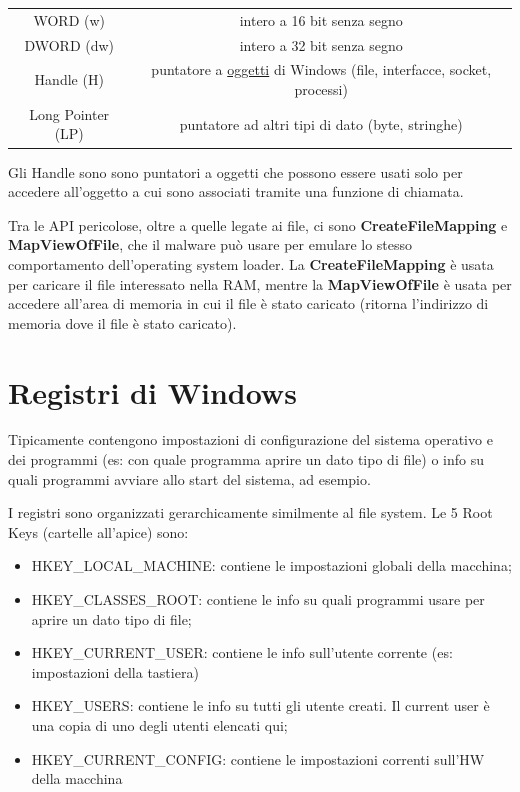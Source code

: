 \documentclass[a4paper]{book}
\begin{document}
\begin{table}[h]
    \centering
    \begin{tabular}{c|c}
        WORD (w)     &  intero a 16 bit senza segno\\
        DWORD  (dw)   & intero a 32 bit senza segno\\
        Handle  (H) & puntatore a \underline{oggetti} di Windows (file, interfacce, socket, processi)\\
        Long Pointer (LP) & puntatore ad altri tipi di dato (byte, stringhe)
    \end{tabular}
\end{table}

Gli Handle sono sono puntatori a oggetti che possono essere usati solo per accedere all'oggetto a cui sono associati tramite una funzione di chiamata.

Tra le API pericolose, oltre a quelle legate ai file, ci sono \textbf{CreateFileMapping} e \textbf{MapViewOfFile}, che il malware può usare per emulare lo stesso comportamento dell'operating system loader. La \textbf{CreateFileMapping} è usata per caricare il file interessato nella RAM, mentre la \textbf{MapViewOfFile} è usata per accedere all'area di memoria in cui il file è stato caricato (ritorna l'indirizzo di memoria dove il file è stato caricato). 

\section{Registri di Windows}
Tipicamente contengono impostazioni di configurazione del sistema operativo e dei programmi (es: con quale programma aprire un dato tipo di file) o info su quali programmi avviare allo start del sistema, ad esempio.

I registri sono organizzati gerarchicamente similmente al file system. Le 5 Root Keys (cartelle all'apice) sono:
\begin{itemize}
    \item HKEY\_LOCAL\_MACHINE: contiene le impostazioni globali della macchina; 
    \item HKEY\_CLASSES\_ROOT: contiene le info su quali programmi usare per aprire un dato tipo di file;
    \item HKEY\_CURRENT\_USER: contiene le info sull'utente corrente (es: impostazioni della tastiera)
    \item HKEY\_USERS: contiene le info su tutti gli utente creati. Il current user è una copia di uno degli utenti elencati qui;
    \item HKEY\_CURRENT\_CONFIG: contiene le impostazioni correnti sull'HW della macchina
\end{itemize}
\end{document}
